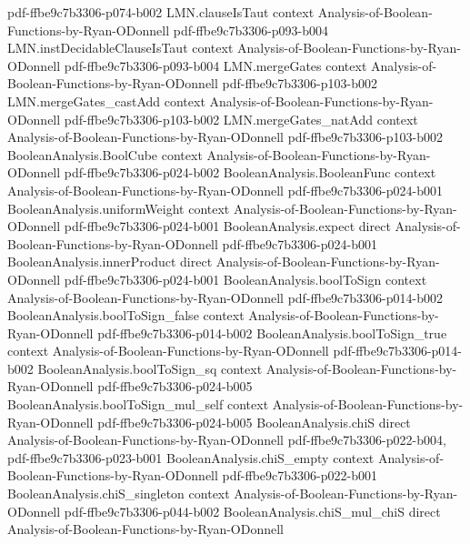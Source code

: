 \begin{theorem}
  {pdf-ffbe9c7b3306-p074-b002}
\proofstep
  {LMN.clauseIsTaut}
  {context}
  {Analysis-of-Boolean-Functions-by-Ryan-ODonnell}
  {pdf-ffbe9c7b3306-p093-b004}
\proofstep
  {LMN.instDecidableClauseIsTaut}
  {context}
  {Analysis-of-Boolean-Functions-by-Ryan-ODonnell}
  {pdf-ffbe9c7b3306-p093-b004}
\proofstep
  {LMN.mergeGates}
  {context}
  {Analysis-of-Boolean-Functions-by-Ryan-ODonnell}
  {pdf-ffbe9c7b3306-p103-b002}
\proofstep
  {LMN.mergeGates_castAdd}
  {context}
  {Analysis-of-Boolean-Functions-by-Ryan-ODonnell}
  {pdf-ffbe9c7b3306-p103-b002}
\proofstep
  {LMN.mergeGates_natAdd}
  {context}
  {Analysis-of-Boolean-Functions-by-Ryan-ODonnell}
  {pdf-ffbe9c7b3306-p103-b002}
\proofstep
  {BooleanAnalysis.BoolCube}
  {context}
  {Analysis-of-Boolean-Functions-by-Ryan-ODonnell}
  {pdf-ffbe9c7b3306-p024-b002}
\proofstep
  {BooleanAnalysis.BooleanFunc}
  {context}
  {Analysis-of-Boolean-Functions-by-Ryan-ODonnell}
  {pdf-ffbe9c7b3306-p024-b001}
\proofstep
  {BooleanAnalysis.uniformWeight}
  {context}
  {Analysis-of-Boolean-Functions-by-Ryan-ODonnell}
  {pdf-ffbe9c7b3306-p024-b001}
\proofstep
  {BooleanAnalysis.expect}
  {direct}
  {Analysis-of-Boolean-Functions-by-Ryan-ODonnell}
  {pdf-ffbe9c7b3306-p024-b001}
\proofstep
  {BooleanAnalysis.innerProduct}
  {direct}
  {Analysis-of-Boolean-Functions-by-Ryan-ODonnell}
  {pdf-ffbe9c7b3306-p024-b001}
\proofstep
  {BooleanAnalysis.boolToSign}
  {context}
  {Analysis-of-Boolean-Functions-by-Ryan-ODonnell}
  {pdf-ffbe9c7b3306-p014-b002}
\proofstep
  {BooleanAnalysis.boolToSign_false}
  {context}
  {Analysis-of-Boolean-Functions-by-Ryan-ODonnell}
  {pdf-ffbe9c7b3306-p014-b002}
\proofstep
  {BooleanAnalysis.boolToSign_true}
  {context}
  {Analysis-of-Boolean-Functions-by-Ryan-ODonnell}
  {pdf-ffbe9c7b3306-p014-b002}
\proofstep
  {BooleanAnalysis.boolToSign_sq}
  {context}
  {Analysis-of-Boolean-Functions-by-Ryan-ODonnell}
  {pdf-ffbe9c7b3306-p024-b005}
\proofstep
  {BooleanAnalysis.boolToSign_mul_self}
  {context}
  {Analysis-of-Boolean-Functions-by-Ryan-ODonnell}
  {pdf-ffbe9c7b3306-p024-b005}
\proofstep
  {BooleanAnalysis.chiS}
  {direct}
  {Analysis-of-Boolean-Functions-by-Ryan-ODonnell}
  {pdf-ffbe9c7b3306-p022-b004,
    pdf-ffbe9c7b3306-p023-b001}
\proofstep
  {BooleanAnalysis.chiS_empty}
  {context}
  {Analysis-of-Boolean-Functions-by-Ryan-ODonnell}
  {pdf-ffbe9c7b3306-p022-b001}
\proofstep
  {BooleanAnalysis.chiS_singleton}
  {context}
  {Analysis-of-Boolean-Functions-by-Ryan-ODonnell}
  {pdf-ffbe9c7b3306-p044-b002}
\proofstep
  {BooleanAnalysis.chiS_mul_chiS}
  {direct}
  {Analysis-of-Boolean-Functions-by-Ryan-ODonnell}

\end{theorem}

